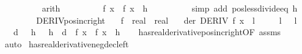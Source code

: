 \begin{isabellebody}
\ \ \ \ \ \ \ \ \isamarkupfalse%
\ arith\isanewline
\ \ \ \ \ \ \isamarkupfalse%
\ \isamarkupfalse%
\ {\isachardoublequoteopen}f\ x\ {\isacharless}{\kern0pt}\ f\ {\isacharparenleft}{\kern0pt}x\ {\isacharplus}{\kern0pt}\ h{\isacharparenright}{\kern0pt}{\isachardoublequoteclose}\isanewline
\ \ \ \ \ \ \ \ \isamarkupfalse%
\ {\isacharparenleft}{\kern0pt}simp\ add{\isacharcolon}{\kern0pt}\ pos{\isacharunderscore}{\kern0pt}less{\isacharunderscore}{\kern0pt}divide{\isacharunderscore}{\kern0pt}eq\ h{\isacharparenright}{\kern0pt}\isanewline
\ \ \ \ \isamarkupfalse%
\isanewline
\ \ \isamarkupfalse%
\isanewline
{}\isamarkupfalse%
%
\endisatagproof
{\isafoldproof}%
%
\isadelimproof
\isanewline
%
\endisadelimproof
\isanewline
{}\isamarkupfalse%
\ DERIV{\isacharunderscore}{\kern0pt}pos{\isacharunderscore}{\kern0pt}inc{\isacharunderscore}{\kern0pt}right{\isacharcolon}{\kern0pt}\isanewline
\ \ \ f\ {\isacharcolon}{\kern0pt}{\isacharcolon}{\kern0pt}\ {\isachardoublequoteopen}real\ {\isasymRightarrow}\ real{\isachardoublequoteclose}\isanewline
\ \ \ der{\isacharcolon}{\kern0pt}\ {\isachardoublequoteopen}DERIV\ f\ x\ {\isacharcolon}{\kern0pt}{\isachargreater}{\kern0pt}\ l{\isachardoublequoteclose}\isanewline
\ \ \ \ \ l{\isacharcolon}{\kern0pt}\ {\isachardoublequoteopen}{}\ {\isacharless}{\kern0pt}\ l{\isachardoublequoteclose}\isanewline
\ \ \ {\isachardoublequoteopen}{\isasymexists}d\ {\isachargreater}{\kern0pt}\ {}{\isachardot}{\kern0pt}\ {\isasymforall}h\ {\isachargreater}{\kern0pt}\ {}{\isachardot}{\kern0pt}\ h\ {\isacharless}{\kern0pt}\ d\ {\isasymlongrightarrow}\ f\ x\ {\isacharless}{\kern0pt}\ f\ {\isacharparenleft}{\kern0pt}x\ {\isacharplus}{\kern0pt}\ h{\isacharparenright}{\kern0pt}{\isachardoublequoteclose}\isanewline
%
\isadelimproof
\ \ %
\endisadelimproof
%
\isatagproof
{}\isamarkupfalse%
\ has{\isacharunderscore}{\kern0pt}real{\isacharunderscore}{\kern0pt}derivative{\isacharunderscore}{\kern0pt}pos{\isacharunderscore}{\kern0pt}inc{\isacharunderscore}{\kern0pt}right{\isacharbrackleft}{\kern0pt}OF\ assms{\isacharbrackright}{\kern0pt}\isanewline
\ \ \isamarkupfalse%
\ auto%
\endisatagproof
{\isafoldproof}%
%
\isadelimproof
\isanewline
%
\endisadelimproof
\isanewline
{}\isamarkupfalse%
\ has{\isacharunderscore}{\kern0pt}real{\isacharunderscore}{\kern0pt}derivative{\isacharunderscore}{\kern0pt}neg{\isacharunderscore}{\kern0pt}dec{\isacharunderscore}{\kern0pt}left{\isacharcolon}{\kern0pt}\isanewline

\end{isabellebody}
